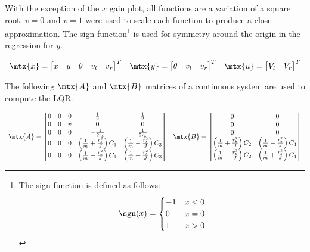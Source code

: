 With the exception of the $x$ gain plot, all functions are a variation of a
square root. $v = 0$ and $v = 1$ were used to scale each function to produce a
close approximation. The sign function\footnote{The sign function is defined as
follows:
\begin{equation*}
  \sgn(x) = \begin{cases}
    -1 & x < 0 \\
    0 & x = 0 \\
    1 & x > 0
  \end{cases}
\end{equation*}} is used for symmetry around the origin in the regression for
$y$.
\begin{theorem}
  \begin{equation*}
    \begin{array}{ccc}
      \mtx{x} =
      \begin{bmatrix}
        x & y & \theta & v_l & v_r
      \end{bmatrix}^T &
      \mtx{y} =
      \begin{bmatrix}
        \theta & v_l & v_r
      \end{bmatrix}^T &
      \mtx{u} =
      \begin{bmatrix}
        V_l & V_r
      \end{bmatrix}^T
    \end{array}
  \end{equation*}

  The following $\mtx{A}$ and $\mtx{B}$ matrices of a continuous system are used
  to compute the LQR.

  \begin{equation}
    \begin{array}{ll}
      \mtx{A} =
      \begin{bmatrix}
        0 & 0 & 0 & \frac{1}{2} & \frac{1}{2} \\
        0 & 0 & v & 0 & 0 \\
        0 & 0 & 0 & -\frac{1}{2r_b} & \frac{1}{2r_b} \\
        0 & 0 & 0 & \left(\frac{1}{m} + \frac{r_b^2}{J}\right) C_1 &
          \left(\frac{1}{m} - \frac{r_b^2}{J}\right) C_3 \\
        0 & 0 & 0 & \left(\frac{1}{m} - \frac{r_b^2}{J}\right) C_1 &
          \left(\frac{1}{m} + \frac{r_b^2}{J}\right) C_3
      \end{bmatrix} &
      \mtx{B} =
      \begin{bmatrix}
        0 & 0 \\
        0 & 0 \\
        0 & 0 \\
        \left(\frac{1}{m} + \frac{r_b^2}{J}\right) C_2 &
        \left(\frac{1}{m} - \frac{r_b^2}{J}\right) C_4 \\
        \left(\frac{1}{m} - \frac{r_b^2}{J}\right) C_2 &
        \left(\frac{1}{m} + \frac{r_b^2}{J}\right) C_4
      \end{bmatrix}
    \end{array}
  \end{equation}


\end{theorem}
